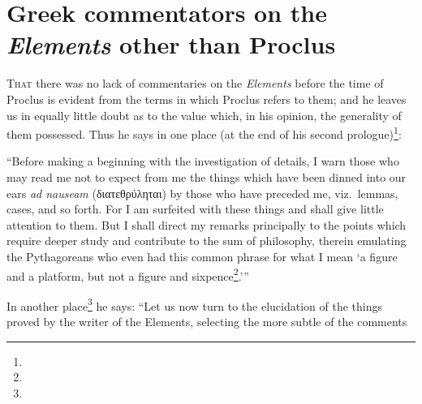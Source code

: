 \chapter{Greek commentators on the \emph{Elements} other than Proclus}

\textsc{That} there was no lack of commentaries on the \emph{Elements} before the time of Proclus is evident from the terms in which Proclus refers to them; and he leaves us in equally little doubt as to the value which, in his opinion, the generality of them possessed. Thus he says in one place (at the end of his second prologue)\footnote{}:

``Before making a beginning with the investigation of details, I warn those who may read me not to expect from me the things which have been dinned into our ears \emph{ad nauseam} (διατεθρύληται) by those who have preceded me, viz.\ lemmas, cases, and so forth. For I am surfeited with these things and shall give little attention to them. But I shall direct my remarks principally to the points which require deeper study and contribute to the sum of philosophy, therein emulating the Pythagoreans who even had this common phrase for what I mean `a figure and a platform, but not a figure and sixpence\footnote{}.'\thinspace''

In another place\footnote{} he says: ``Let us now turn to the elucidation of the things proved by the writer of the Elements, selecting the more subtle of the comments
